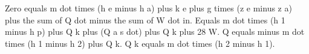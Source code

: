 Zero equals m dot times (h e minus h a) plus k e plus g times (z e minus z a) plus the sum of Q dot minus the sum of W dot in.  
Equals m dot times (h 1 minus h p) plus Q k plus (Q a s dot) plus Q k plus 28 W.  
Q equals minus m dot times (h 1 minus h 2) plus Q k.  
Q k equals m dot times (h 2 minus h 1).
